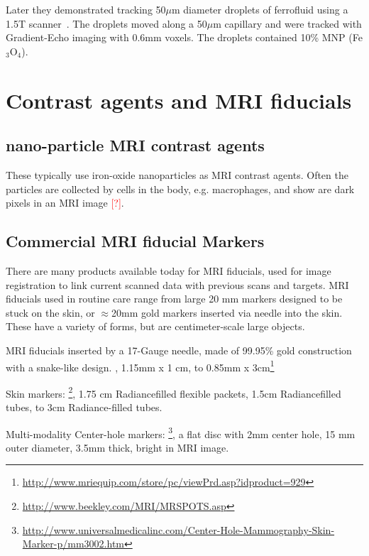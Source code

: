 \documentclass[letterpaper, 10 pt, conference]{ieeeconf}
\newcommand\todo[1]{\textcolor{red}{#1}}   %
\begin{document}
 Later they demonstrated tracking 50$\mu$m diameter droplets of ferrofluid using a 1.5T scanner~\cite{olamaei2013magnetic}.  The droplets moved along a 50$\mu$m capillary and were tracked with Gradient-Echo imaging with 0.6mm voxels.  The droplets contained 10\% MNP (Fe$_\textrm{3}$O$_{\textrm{4}}$).
 
 
 \section{Contrast agents and MRI fiducials}

\subsection{nano-particle MRI contrast agents}
These typically use iron-oxide nanoparticles as MRI contrast agents.  Often the particles are collected by cells in the body, e.g. macrophages, and show are dark pixels in an MRI image \todo{[?]}.




\subsection{Commercial MRI fiducial Markers}

There are many products available today for MRI fiducials, used for image registration to link current scanned data with previous scans and targets. 
MRI fiducials used in routine care range from large 20 mm markers designed to be stuck on the skin, or $\approx$20mm gold markers inserted via needle into the skin.
These have a variety of forms, but are centimeter-scale large objects.


MRI fiducials inserted by a 17-Gauge needle, made of 99.95\% gold construction with a snake-like design.  , 1.15mm x 1 cm, to 0.85mm x 3cm\footnote{\url{http://www.mriequip.com/store/pc/viewPrd.asp?idproduct=929}}

Skin markers: \footnote{\url{http://www.beekley.com/MRI/MRSPOTS.asp}}, 1.75 cm Radiance{\texttrademark}filled flexible packets,  1.5cm Radiance{\texttrademark}filled tubes, to 3cm Radiance{\texttrademark}-filled tubes.

Multi-modality Center-hole markers: \footnote{\url{http://www.universalmedicalinc.com/Center-Hole-Mammography-Skin-Marker-p/mm3002.htm}}, a flat disc with 2mm center hole, 15 mm outer diameter, 3.5mm thick, bright in MRI image.
 
 


\end{document}
